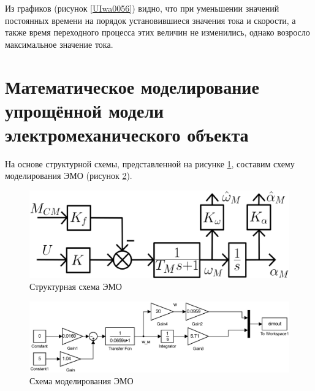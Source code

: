 \documentclass[a4paper,12pt]{article} %
\begin{document}
Из графиков (рисунок \ref{UIwa0056}) видно, что при уменьшении значений постоянных времени на порядок установившиеся значения тока и скорости, а также время переходного процесса этих величин не изменились, однако возросло максимальное значение тока.

\newpage
\section{Математическое моделирование упрощённой модели электромеханического объекта}	 
На основе структурной схемы, представленной на рисунке \ref{simpScheme}, составим схему моделирования ЭМО (рисунок \ref{cxema2}).
\begin{figure}[ht!]
	\centering
	\includegraphics[width = \textwidth]{scheme/simpScheme}
	\caption{Структурная схема ЭМО}
	\label{simpScheme}
\end{figure}
\begin{figure}[ht!]
	\centering
 	\includegraphics[width = \textwidth]{scheme/SRscheme}
	\caption{Схема моделирования ЭМО}
	\label{cxema2}
\end{figure}
\end{document}
